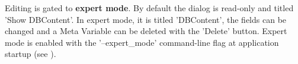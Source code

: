 Editing is gated to \textbf{expert mode}. By default the dialog is read-only and titled 'Show DBContent'. In expert mode, it is titled 'DBContent', the fields can be changed and a Meta Variable can be deleted with the 'Delete' button. Expert mode is enabled with the '--expert\_mode' command-line flag at application startup (see ).
